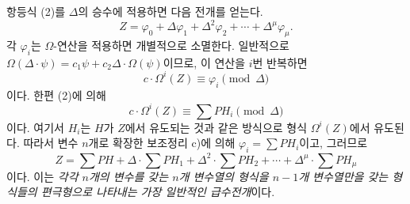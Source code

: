 
항등식 (2)를 $\Delta$의 승수에 적용하면 다음 전개를 얻는다.
\[
  Z=\varphi_0+\Delta\varphi_1+\Delta^2\varphi_2+\cdots+\Delta^\mu\varphi_\mu.
\]
각 $\varphi_i$는 $\Omega$-연산을 적용하면 개별적으로 소멸한다. 일반적으로 $\Omega(\Delta\cdot\psi)=c_1\psi+c_2\Delta\cdot\Omega(\psi)$이므로, 이 연산을 $i$번 반복하면
\[
  c\cdot \Omega^i(Z)\equiv\varphi_i\pmod{\Delta}
\]
이다. 한편 (2)에 의해
\[
  c\cdot\Omega^i(Z)\equiv\sum PH_i\pmod{\Delta}
\]
이다. 여기서 $H_i$는 $H$가 $Z$에서 유도되는 것과 같은 방식으로 형식 $\Omega^i(Z)$에서 유도된다. 따라서 변수 $n$개로 확장한 보조정리 c)에 의해 $\varphi_i=\sum PH_i$이고, 그러므로
\begin{equation}
  Z=\sum PH+\Delta\cdot\sum PH_1+\Delta^2\cdot\sum PH_2+
  \cdots+\Delta^\mu\cdot\sum PH_\mu
\tag{3}
\end{equation}
이다. 이는 \emph{각각 $n$개의 변수를 갖는 $n$개 변수열의 형식을 $n-1$개 변수열만을 갖는 형식들의 편극형으로 나타내는 가장 일반적인 급수전개}이다.
